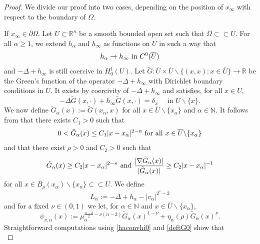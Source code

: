 \documentclass[10pt]{amsart}
\numberwithin{equation}{section}
\newcommand{\R}{\mathbb{R}}
\newcommand{\Om}{\Omega}
\newcommand{\ma}{\mu_\alpha}
\def \rr {\mathbb{R}}
\def \bb{\hbox}
\def \xl{x_\alpha}
\def\la{\alpha}
\def \ma{\mu_{\alpha}}
\def \tg{\tilde{G}}
\def \nn{\mathbb{N}}
\def \ro{\rho}
\theoremstyle{plain}
\theoremstyle{remark}
\begin{document}
\begin{proof}
We divide our proof into two cases, depending on the position of $x_\infty$ with respect to the boundary of $\Om$.


\smallskip {} If $x_{\infty}\in\partial\Om$. Let $U \subset \R^n$ be a smooth bounded open set such that $\overline{\Om}\subset\subset U$. For all $\alpha \ge 1$, we extend $h_{\alpha}$ and $h_{\infty}$ as functions on $U$ in such a way that
\begin{equation}\label{haconvhi0}
	h_{\alpha}\to h_{\infty} \bb{ in }C^0(\overline{U})
\end{equation} 
and $- \Delta + h_\infty$ is still coercive in $H^1_0(U)$. Let $\tg:\overline{U}\times \overline{U}\backslash \{ (x,x): x\in \overline{U}\}\to \rr$ be the Green's function of the operator $-\Delta +h_{\infty}$ with Dirichlet boundary conditions in $U$. It exists by coercivity of $-\Delta + h_\infty$ and satisfies, for all $x \in U$,
\begin{equation}\label{deftG0}
-\Delta \tg(x, \cdot) +h_{\infty} \tg(x,\cdot)= \delta_x \quad \text{ in } U \backslash \{x\}. 
\end{equation}
We now define $\tg_{\la}(x):=\tg(\xl,x)$ for all $x\in \overline{U}\backslash \{\xl\}$ and $\alpha\in \nn$. It follows from \cite{RobDirichlet} that there exists $C_1>0$ such that 
\begin{equation}\label{Grenest1}
0<\tg_{\la} (x) \leq C_1 |x-\xl|^{2-n} \bb{ for all } x\in \overline{U} \backslash \{\xl\}
\end{equation}
and that there exist $\ro>0$ and $C_2>0$ such that 
\begin{equation}\label{Grenest2}
\tg_{\la}(x)\geq C_2|x-\xl|^{2-n} \bb{ and } \frac{|\nabla \tg_{\la}(x)|}{|\tg_{\la}(x)|}\geq C_2 |x-\xl|^{-1}
\end{equation}
for all $x\in B_{\ro}(\xl)\backslash \{\xl\}\subset\subset U$. We define
\begin{equation}\label{Llaope}
L_{\la}:=-\Delta +h_{\alpha} -|v_{\la}|^{2^*-2}
\end{equation}
and for a fixed $\nu \in (0,1)$ we let, for $\alpha \in \nn$ and $x\in \overline{U} \backslash \{\xl\}$,
\begin{equation}\label{defpsi}
	\psi_{\nu,\la}(x):=\ma^{\frac{n-2}{2}-\nu(n-2)}\tg_{\la}(x)^{1-\nu}+\eta_{\la}(\ro)\tg_{\la}(x)^{\nu}.
\end{equation}
Straightforward computations using \eqref{haconvhi0} and \eqref{deftG0} show that 
\begin{equation*}

\end{equation*}
\end{proof}
\end{document}
